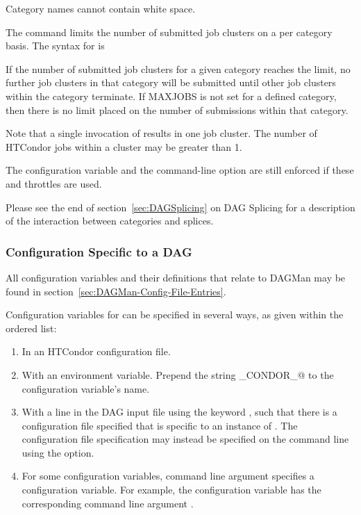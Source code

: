   

Category names cannot contain white space.

The  command limits the number of submitted job clusters
on a per category basis.
The syntax for  is

  

If the number of submitted job clusters for a given category reaches the limit,
no further job clusters in that category will be submitted until other
job clusters within the category terminate.
If MAXJOBS is not set for a defined category,
then there is no limit placed on the number of submissions
within that category.

Note that a single invocation
of  results in one job cluster.
The number of HTCondor jobs within a cluster may be greater than 1. 

The  configuration variable  
and the   command-line option
are still enforced if these  and 
throttles are used.

Please see the end of section~\ref{sec:DAGSplicing}
on DAG Splicing for a description of the interaction between
categories and splices.

\subsubsection{\label{sec:DAG-configuration}Configuration Specific to a DAG}

All configuration variables and their definitions that relate to 
DAGMan may be found in section~\ref{sec:DAGMan-Config-File-Entries}.

Configuration variables for  can be specified in several
ways, as given within the ordered list:
\begin{enumerate}
\item
In an HTCondor configuration file.
\item
With an environment variable.
Prepend the string \verb@_CONDOR_@ to the configuration variable's name.
\item
With a line in the DAG input file using the keyword , 
such that there is a configuration file specified
that is specific to an instance of .
The configuration file specification may instead be specified
on the  command line using the  option.
\item
For some configuration variables,
 command line argument specifies a configuration variable. 
For example, the configuration variable 
has the corresponding command line argument .
\end{enumerate}

